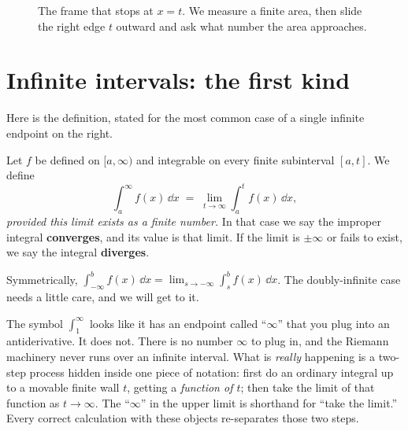\begin{figure}[H]
\centering
{}
\caption{The frame that stops at $x=t$. We measure a finite area, then slide the
right edge $t$ outward and ask what number the area approaches.}
\label{ch25:fig-frame}
\end{figure}

\section{Infinite intervals: the first kind}
\label{ch25:first-kind}

Here is the definition, stated for the most common case of a single infinite
endpoint on the right.

\begin{definition}[Improper integral over $[a,\infty)$]
\label{ch25:def-first-kind}
Let $f$ be defined on $[a,\infty)$ and integrable on every finite subinterval
$[a,t]$. We define
\[
  \int_a^{\infty} f(x)\,\dd x
  \;=\; \lim_{t\to\infty} \int_a^{t} f(x)\,\dd x,
\]
\emph{provided this limit exists as a finite number.} In that case we say the
improper integral \textbf{converges}, and its value is that limit. If the limit is
$\pm\infty$ or fails to exist, we say the integral \textbf{diverges}.
\end{definition}

Symmetrically, $\displaystyle\int_{-\infty}^{b} f(x)\,\dd x = \lim_{s\to-\infty}
\int_s^{b} f(x)\,\dd x$. The doubly-infinite case needs a little care, and we will
get to it.

\begin{happeningbox}
The symbol $\int_1^{\infty}$ looks like it has an endpoint called ``$\infty$'' that
you plug into an antiderivative. It does not. There is no number $\infty$ to plug
in, and the Riemann machinery never runs over an infinite interval. What is
\emph{really} happening is a two-step process hidden inside one piece of notation:
first do an ordinary integral up to a movable finite wall $t$, getting a
\emph{function of $t$}; then take the limit of that function as $t\to\infty$. The
``$\infty$'' in the upper limit is shorthand for ``take the limit.'' Every correct
calculation with these objects re-separates those two steps.
\end{happeningbox}

